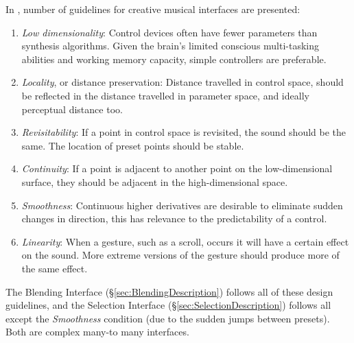 \documentclass[11pt, oneside]{report}   	%
\begin{document}
In \cite{TubbThesis}, number of guidelines for creative musical interfaces are presented:
\begin{enumerate}
	\vspace{-10pt}
\setlength\itemsep{-1.2em}
	\item \emph{Low dimensionality}: Control devices often have fewer parameters than synthesis algorithms. Given the brain's limited conscious multi-tasking abilities and working memory capacity, simple controllers are preferable.
	\item \emph{Locality}, or distance preservation: Distance travelled in control space, should be reflected in the distance travelled in parameter space, and ideally perceptual distance too.
	\item \emph{Revisitability}: If a point in control space is revisited, the sound should be the same. The location of preset points should be stable.
	\item \emph{Continuity}: If a point is adjacent to another point on the low-dimensional surface, they should be adjacent in the high-dimensional space.
	\item \emph{Smoothness}: Continuous higher derivatives are desirable to eliminate sudden changes in direction, this has relevance to the predictability of a control.
	\item \emph{Linearity}: When a gesture, such as a scroll, occurs it will have a certain effect on the sound. More extreme versions of the gesture should produce more of the same effect. %
	\vspace{-10pt}
\end{enumerate}
The Blending Interface (\S \ref{sec:BlendingDescription}) follows all of these design guidelines, and the Selection Interface (\S \ref{sec:SelectionDescription}) follows all except the \emph{Smoothness} condition (due to the sudden jumps between presets). Both are complex many-to many interfaces.
\end{document}

